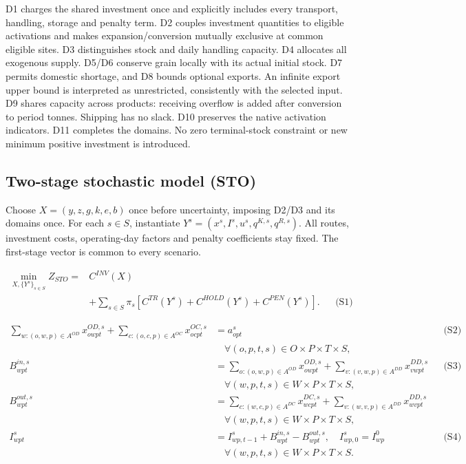 \documentclass[
  english,
  11pt,
  a4paper,
  authoryear,
  preprint]{elsarticle}
\begin{document}
D1 charges the shared investment once and explicitly includes every
transport, handling, storage and penalty term. D2 couples investment
quantities to eligible activations and makes expansion/conversion
mutually exclusive at common eligible sites. D3 distinguishes stock and
daily handling capacity. D4 allocates all exogenous supply. D5/D6
conserve grain locally with its actual initial stock. D7 permits
domestic shortage, and D8 bounds optional exports. An infinite export
upper bound is interpreted as unrestricted, consistently with the
selected input. D9 shares capacity across products: receiving overflow
is added after conversion to period tonnes. Shipping has no slack. D10
preserves the native activation indicators. D11 completes the domains.
No zero terminal-stock constraint or new minimum positive investment is
introduced.

\subsection{Two-stage stochastic model
(STO)}\label{two-stage-stochastic-model-sto}

Choose \(X=(y,z,g,k,e,b)\) once before uncertainty, imposing D2/D3 and
its domains once. For each \(s\in S\), instantiate
\(Y^s=(x^s,I^s,u^s,q^{K,s},q^{R,s})\). All routes, investment costs,
operating-day factors and penalty coefficients stay fixed. The
first-stage vector is common to every scenario.

\[
\begin{aligned}
\min_{X,\{Y^s\}_{s\in S}} Z_{STO}={}&C^{INV}(X)\\
&+\sum_{s\in S}\pi_s
 [C^{TR}(Y^s)+C^{HOLD}(Y^s)+C^{PEN}(Y^s)]. &&\text{(S1)}
\end{aligned}
\]

\[
\begin{aligned}
\sum_{w:(o,w,p)\in A^{OD}}x^{OD,s}_{owpt}
 +\sum_{c:(o,c,p)\in A^{OC}}x^{OC,s}_{ocpt}
 &=a^s_{opt} &&\text{(S2)}\\
 &\quad\forall(o,p,t,s)\in O\times P\times T\times S,\\
B^{in,s}_{wpt}&=\sum_{o:(o,w,p)\in A^{OD}}x^{OD,s}_{owpt}
 +\sum_{v:(v,w,p)\in A^{DD}}x^{DD,s}_{vwpt}
 &&\text{(S3)}\\
 &\quad\forall(w,p,t,s)\in W\times P\times T\times S,\\
B^{out,s}_{wpt}&=\sum_{c:(w,c,p)\in A^{DC}}x^{DC,s}_{wcpt}
 +\sum_{v:(w,v,p)\in A^{DD}}x^{DD,s}_{wvpt}\\
 &\quad\forall(w,p,t,s)\in W\times P\times T\times S,\\
I^s_{wpt}&=I^s_{wp,t-1}+B^{in,s}_{wpt}-B^{out,s}_{wpt},\quad I^s_{wp,0}=I^0_{wp}
 &&\text{(S4)}\\
 &\quad\forall(w,p,t,s)\in W\times P\times T\times S.
\end{aligned}
\]
\end{document}

